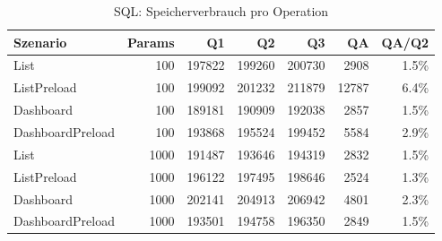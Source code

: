 \begin{table}[ht]
\centering
\caption{SQL: Speicherverbrauch pro Operation}
\begin{tabular}{lrrrrrr}
\toprule
Szenario & Params & Q1 & Q2 & Q3 & QA & QA/Q2 \\
\midrule
		List & 100 & 197822 & 199260 & 200730 & 2908 & 1.5\% \\
		ListPreload & 100 & 199092 & 201232 & 211879 & 12787 & 6.4\% \\
		Dashboard & 100 & 189181 & 190909 & 192038 & 2857 & 1.5\% \\
		DashboardPreload & 100 & 193868 & 195524 & 199452 & 5584 & 2.9\% \\
		List & 1000 & 191487 & 193646 & 194319 & 2832 & 1.5\% \\
		ListPreload & 1000 & 196122 & 197495 & 198646 & 2524 & 1.3\% \\
		Dashboard & 1000 & 202141 & 204913 & 206942 & 4801 & 2.3\% \\
		DashboardPreload & 1000 & 193501 & 194758 & 196350 & 2849 & 1.5\% \\
\bottomrule
\end{tabular}
\label{tab:benchmark_sql_bytesperop}
\end{table}
	